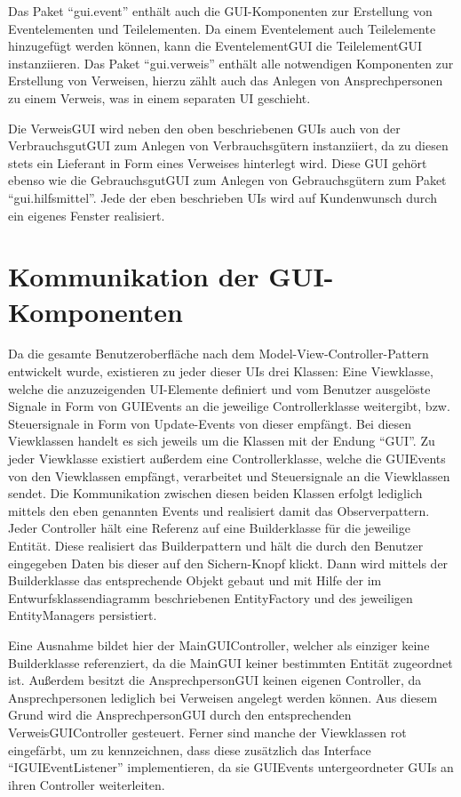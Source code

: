 Das Paket \enquote{gui.event} enthält auch die GUI-Komponenten zur Erstellung von Eventelementen und Teilelementen. Da einem Eventelement auch Teilelemente hinzugefügt werden können, kann die EventelementGUI die TeilelementGUI instanziieren. Das Paket \enquote{gui.verweis} enthält alle notwendigen Komponenten zur Erstellung von Verweisen, hierzu zählt auch das Anlegen von Ansprechpersonen zu einem Verweis, was in einem separaten UI geschieht. 

Die VerweisGUI wird neben den oben beschriebenen GUIs auch von der VerbrauchsgutGUI zum Anlegen von Verbrauchsgütern instanziiert, da zu diesen stets ein Lieferant in Form eines Verweises hinterlegt wird. Diese GUI gehört ebenso wie die GebrauchsgutGUI zum Anlegen von Gebrauchsgütern zum Paket \enquote{gui.hilfsmittel}. Jede der eben beschrieben UIs wird auf Kundenwunsch durch ein eigenes Fenster realisiert.

\section{Kommunikation der GUI-Komponenten}
Da die gesamte Benutzeroberfläche nach dem Model-View-Controller-Pattern entwickelt wurde, existieren zu jeder dieser UIs drei Klassen: Eine Viewklasse, welche die anzuzeigenden UI-Elemente definiert und vom Benutzer ausgelöste Signale in Form von GUIEvents an die jeweilige Controllerklasse weitergibt, bzw. Steuersignale in Form von Update-Events von dieser empfängt. Bei diesen Viewklassen handelt es sich jeweils um die Klassen mit der Endung \enquote{GUI}. Zu jeder Viewklasse existiert außerdem eine Controllerklasse, welche die GUIEvents von den Viewklassen empfängt, verarbeitet und Steuersignale an die Viewklassen sendet. Die Kommunikation zwischen diesen beiden Klassen erfolgt lediglich mittels den eben genannten Events und realisiert damit das Observerpattern. Jeder Controller hält eine Referenz auf eine Builderklasse für die jeweilige Entität. Diese realisiert das Builderpattern und hält die durch den Benutzer eingegeben Daten bis dieser auf den Sichern-Knopf klickt. Dann wird mittels der Builderklasse das entsprechende Objekt gebaut und mit Hilfe der im Entwurfsklassendiagramm beschriebenen EntityFactory und des jeweiligen EntityManagers persistiert.

Eine Ausnahme bildet hier der MainGUIController, welcher als einziger keine Builderklasse referenziert, da die MainGUI keiner bestimmten Entität zugeordnet ist. Außerdem besitzt die AnsprechpersonGUI keinen eigenen Controller, da Ansprechpersonen lediglich bei Verweisen angelegt werden können. Aus diesem Grund wird die AnsprechpersonGUI durch den entsprechenden VerweisGUIController gesteuert. Ferner sind manche der Viewklassen rot eingefärbt, um zu kennzeichnen, dass diese zusätzlich das Interface \enquote{IGUIEventListener} implementieren, da sie GUIEvents untergeordneter GUIs an ihren Controller weiterleiten.

